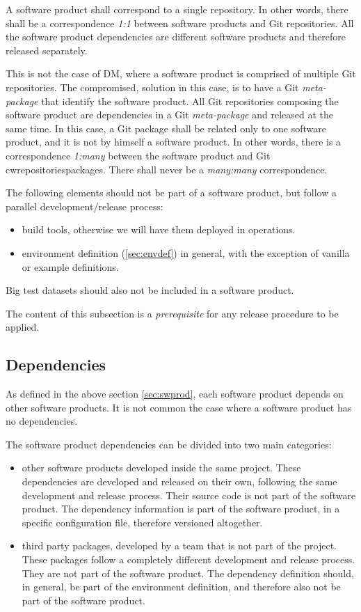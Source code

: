 A software product shall correspond to a single repository.
In other words, there shall be a correspondence \textit{1:1} between software products and Git repositories.
All the software product dependencies are different software products and therefore released separately.

This is not the case of DM, where a software product is comprised of multiple Git repositories.
The compromised, solution in this case, is to have a Git \textit{meta-package} that identify the software product.
All Git repositories composing the software product are dependencies in a Git \textit{meta-package} and released at the same time.
In this case, a Git package shall be related only to one software product, and it is not by himself a software product.
In other words, there is a correspondence \textit{1:many} between the software product and Git cwrepositoriespackages.
There shall never be a \textit{many:many} correspondence.

The following elements should not be part of a software product, but follow a parallel development/release process:

\begin{itemize}
\item build tools, otherwise we will have them deployed in operations.
\item environment definition (\ref{sec:envdef}) in general, with the exception of vanilla or example definitions.
\end{itemize}

Big test datasets should also not be included in a software product. 

The content of this subsection is a \textit{prerequisite} for any release procedure to be applied.


\subsection{Dependencies} \label{sec:dependencies}

As defined in the above section \ref{sec:swprod}, each software product depends on other software products.
It is not common the case where a software product has no dependencies.

The software product dependencies can be divided into two main categories:

\begin{itemize}
\item other software products developed inside the same project.
These dependencies are developed and released on their own, following the same development and release process.
Their source code is not part of the software product.
The dependency information is part of the software product, in a specific configuration file, therefore versioned altogether.
\item third party packages, developed by a team that is not part of the project.
These packages follow a completely different development and release process.
They are not part of the software product.
The dependency definition should, in general, be part of the environment definition, and therefore also not be part of the software product.
\end{itemize}


